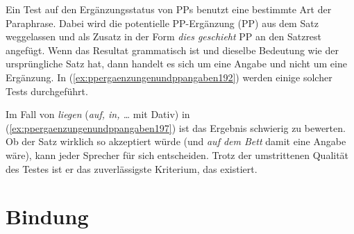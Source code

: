Ein Test auf den Ergänzungsstatus von PPs benutzt eine bestimmte Art der Paraphrase.
Dabei wird die potentielle PP-Ergänzung (PP) aus dem Satz weggelassen und als Zusatz in der Form \textit{dies geschieht} PP an den Satzrest angefügt.
Wenn das Resultat grammatisch ist und dieselbe Bedeutung wie der ursprüngliche Satz hat, dann handelt es sich um eine Angabe und nicht um eine Ergänzung.
In (\ref{ex:ppergaenzungenundppangaben192}) werden einige solcher Tests durchgeführt.

\begin{exe}
  \ex\label{ex:ppergaenzungenundppangaben192}
  \begin{xlist}
  \end{xlist}
\end{exe}

Im Fall von \textit{liegen} (\textit{auf, in, \ldots} mit Dativ) in (\ref{ex:ppergaenzungenundppangaben197}) ist das Ergebnis schwierig zu bewerten.
Ob der Satz wirklich so akzeptiert würde (und \textit{auf dem Bett} damit eine Angabe wäre), kann jeder Sprecher für sich entscheiden.
Trotz der umstrittenen Qualität des Testes ist er das zuverlässigste Kriterium, das existiert.


\section{Bindung}
\label{sec:bindung}

